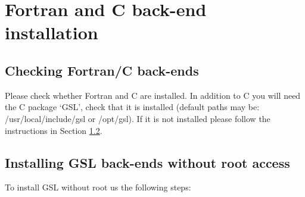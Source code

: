 \section{Fortran and C back-end installation}
\label{section:fortran_gsl}

\subsection{Checking Fortran/C back-ends}
\label{section:checking for Fortran/C}


Please check whether Fortran and C are installed. In addition to C you will need the C package `GSL', check that it is installed (default paths may be: /usr/local/include/gsl or /opt/gsl). If it is not installed please follow the instructions in Section \ref{section:install-gsl}.

\subsection{Installing GSL back-ends without root access}
\label{section:install-gsl}

To install GSL without root us the following steps:

